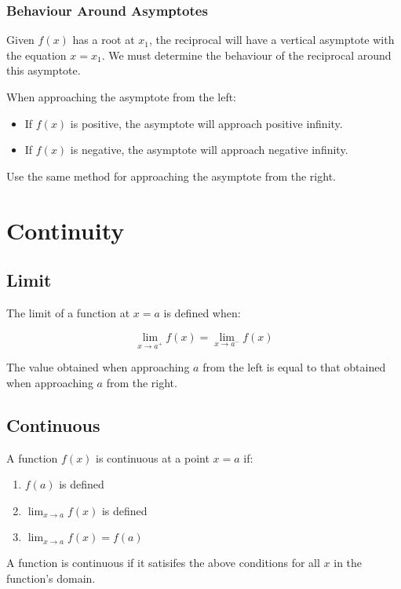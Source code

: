 \documentclass[a4paper,11pt]{report}
\begin{document}
\subsubsection{Behaviour Around Asymptotes}

Given $f(x)$ has a root at $x_1$, the reciprocal will have a vertical asymptote
with the equation $x = x_1$.
We must determine the behaviour of the reciprocal around this asymptote.

When approaching the asymptote from the left:

\begin{itemize}
\item If $f(x)$ is positive, the asymptote will approach positive infinity.
\item If $f(x)$ is negative, the asymptote will approach negative infinity.
\end{itemize}

Use the same method for approaching the asymptote from the right.


\section{Continuity}

\subsection{Limit}

The limit of a function at $x = a$ is defined when:

$$
\lim_{x \to a^+} f(x) = \lim_{x \to a^-} f(x)
$$

The value obtained when approaching $a$ from the left is equal to that obtained
when approaching $a$ from the right.

\subsection{Continuous}

A function $f(x)$ is continuous at a point $x = a$ if:

\begin{enumerate}
\item $f(a)$ is defined
\item $\lim_{x \to a} f(x)$ is defined
\item $\lim_{x \to a} f(x) = f(a)$
\end{enumerate}

A function is continuous if it satisifes the above conditions for all $x$ in
the function's domain.
\end{document}
